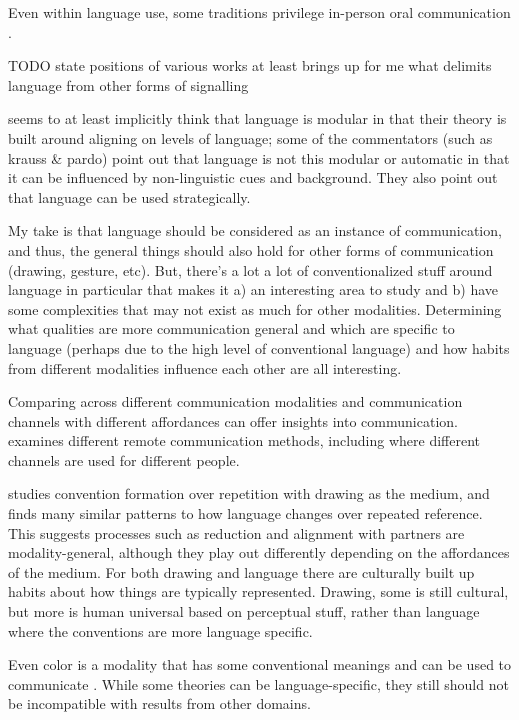 \documentclass[]{article}
\begin{document}
Even within language use, some traditions privilege in-person oral communication \cite{clark1996}. 

TODO state positions of various works
\cite{clark1996} at least brings up for me what delimits language from other forms of signalling

\cite{pickering2004} seems to at least implicitly think that language is modular in that their theory is built around aligning on levels of language; some of the commentators (such as krauss \& pardo) point out that language is not this modular or automatic in that it can be influenced by non-linguistic cues and background. They also point out that language can be used strategically. 



My take is that language should be considered as an instance of communication, and thus, the general things should also hold for other forms of communication (drawing, gesture, etc). But, there's a lot a lot of conventionalized stuff around language in particular that makes it a) an interesting area to study and b) have some complexities that may not exist as much for other modalities. Determining what qualities are more communication general and which are specific to language (perhaps due to the high level of conventional language) and how habits from different modalities influence each other are all interesting. 

Comparing across different communication modalities and communication channels with different affordances can offer insights into communication. \cite{foxtree2013} examines different remote communication methods, including where different channels are used for different people. 

\cite{hawkinsa} studies convention formation over repetition with drawing as the medium, and finds many similar patterns to how language changes over repeated reference. This suggests processes such as reduction and alignment with partners are modality-general, although they play out differently depending on the affordances of the medium. For both drawing and language there are culturally built up habits about how things are typically represented. Drawing, some is still cultural, but more is human universal based on perceptual stuff, rather than language where the conventions are more language specific. 

Even color is a modality that has some conventional meanings and can be used to communicate \cite{murthy2022}. While some theories can be language-specific, they still should not be incompatible with results from other domains. 
\end{document}
